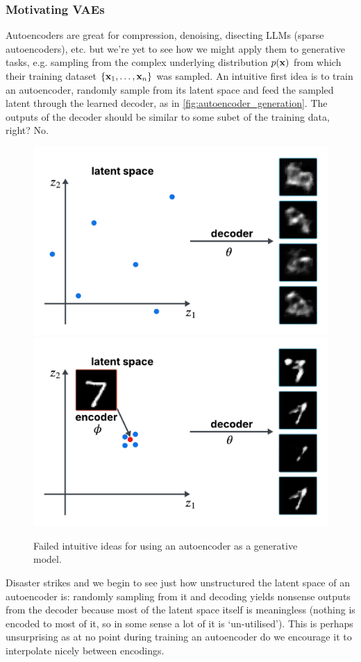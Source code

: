 \documentclass[11pt]{article}
\begin{document}
\subsubsection{Motivating VAEs}
Autoencoders are great for compression, denoising, disecting LLMs (sparse autoencoders), etc. but we're yet to see how we might apply them to generative tasks, e.g. sampling from the complex underlying distribution $p(\mathbf{x})$ from which their training dataset $\{\mathbf{x}_1,\dots,\mathbf{x}_n\}$ was sampled. An intuitive first idea is to train an autoencoder, randomly sample from its latent space and feed the sampled latent through the learned decoder, as in \autoref{fig:autoencoder_generation}. The outputs of the decoder should be similar to some subet of the training data, right? No.

\begin{figure}[t]
    \centering
    \includegraphics[width=0.49\columnwidth]{./figures/generative_models/AE_gen_1.pdf}
    \includegraphics[width=0.49\columnwidth]{./figures/generative_models/AE_gen_2.pdf}
    \caption{Failed intuitive ideas for using an autoencoder as a generative model.}
    \label{fig:autoencoder_generation}
\end{figure}

Disaster strikes and we begin to see just how unstructured the latent space of an autoencoder is: randomly sampling from it and decoding yields nonsense outputs from the decoder because most of the latent space itself is meaningless (nothing is encoded to most of it, so in some sense a lot of it is `un-utilised'). This is perhaps unsurprising as at no point during training an autoencoder do we encourage it to interpolate nicely between encodings.
\end{document}
